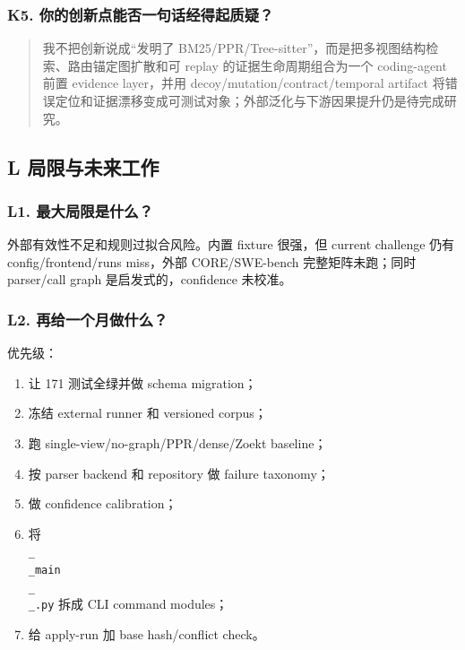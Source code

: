 \documentclass[UTF8,12pt,openany]{ctexbook}
\begin{document}
\subsubsection{K5. 你的创新点能否一句话经得起质疑？}

\begin{quote}
我不把创新说成“发明了 BM25/PPR/Tree-sitter”，而是把多视图结构检索、路由锚定图扩散和可 replay 的证据生命周期组合为一个 coding-agent 前置 evidence layer，并用 decoy/mutation/contract/temporal artifact 将错误定位和证据漂移变成可测试对象；外部泛化与下游因果提升仍是待完成研究。
\end{quote}

\subsection{L 局限与未来工作}

\subsubsection{L1. 最大局限是什么？}

外部有效性不足和规则过拟合风险。内置 fixture 很强，但 current challenge 仍有 config/frontend/runs miss，外部 CORE/SWE-bench 完整矩阵未跑；同时 parser/call graph 是启发式的，confidence 未校准。\par

\subsubsection{L2. 再给一个月做什么？}

优先级：\par

\begin{enumerate}
\item 让 171 测试全绿并做 schema migration；
\item 冻结 external runner 和 versioned corpus；
\item 跑 single-view/no-graph/PPR/dense/Zoekt baseline；
\item 按 parser backend 和 repository 做 failure taxonomy；
\item 做 confidence calibration；
\item 将 \texttt{\\_\\_main\\_\\_.py} 拆成 CLI command modules；
\item 给 apply-run 加 base hash/conflict check。
\end{enumerate}
\end{document}
